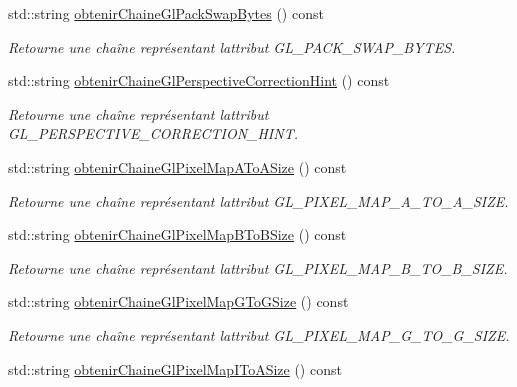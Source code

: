 \begin{DoxyCompactItemize}
std\+::string \hyperlink{group__utilitaire_ga34c8e9bce5b0b759995934900bc33e14}{obtenir\+Chaine\+Gl\+Pack\+Swap\+Bytes} () const 
\begin{DoxyCompactList}\small\item\em Retourne une chaîne représentant l\textquotesingle{}attribut G\+L\+\_\+\+P\+A\+C\+K\+\_\+\+S\+W\+A\+P\+\_\+\+B\+Y\+T\+E\+S. \end{DoxyCompactList}\item 
std\+::string \hyperlink{group__utilitaire_ga2f8a371d540a654c038ff2e3301a63d3}{obtenir\+Chaine\+Gl\+Perspective\+Correction\+Hint} () const 
\begin{DoxyCompactList}\small\item\em Retourne une chaîne représentant l\textquotesingle{}attribut G\+L\+\_\+\+P\+E\+R\+S\+P\+E\+C\+T\+I\+V\+E\+\_\+\+C\+O\+R\+R\+E\+C\+T\+I\+O\+N\+\_\+\+H\+I\+N\+T. \end{DoxyCompactList}\item 
std\+::string \hyperlink{group__utilitaire_ga6d92a97f95de6e5eb298d27c342a4375}{obtenir\+Chaine\+Gl\+Pixel\+Map\+A\+To\+A\+Size} () const 
\begin{DoxyCompactList}\small\item\em Retourne une chaîne représentant l\textquotesingle{}attribut G\+L\+\_\+\+P\+I\+X\+E\+L\+\_\+\+M\+A\+P\+\_\+\+A\+\_\+\+T\+O\+\_\+\+A\+\_\+\+S\+I\+Z\+E. \end{DoxyCompactList}\item 
std\+::string \hyperlink{group__utilitaire_ga554e72e1ef666b6dca527a1073219c9e}{obtenir\+Chaine\+Gl\+Pixel\+Map\+B\+To\+B\+Size} () const 
\begin{DoxyCompactList}\small\item\em Retourne une chaîne représentant l\textquotesingle{}attribut G\+L\+\_\+\+P\+I\+X\+E\+L\+\_\+\+M\+A\+P\+\_\+\+B\+\_\+\+T\+O\+\_\+\+B\+\_\+\+S\+I\+Z\+E. \end{DoxyCompactList}\item 
std\+::string \hyperlink{group__utilitaire_gad80ac227ca04522df384be1e0f93b546}{obtenir\+Chaine\+Gl\+Pixel\+Map\+G\+To\+G\+Size} () const 
\begin{DoxyCompactList}\small\item\em Retourne une chaîne représentant l\textquotesingle{}attribut G\+L\+\_\+\+P\+I\+X\+E\+L\+\_\+\+M\+A\+P\+\_\+\+G\+\_\+\+T\+O\+\_\+\+G\+\_\+\+S\+I\+Z\+E. \end{DoxyCompactList}\item 
std\+::string \hyperlink{group__utilitaire_gadadb89e110f09aaf815829f028ab539d}{obtenir\+Chaine\+Gl\+Pixel\+Map\+I\+To\+A\+Size} () const 

\end{DoxyCompactItemize}
